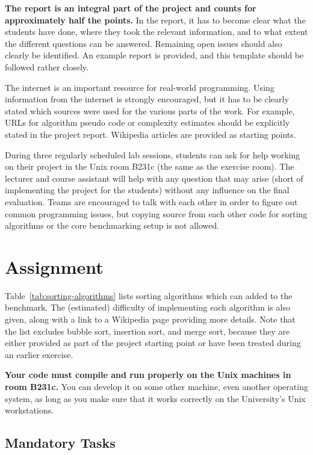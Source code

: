 \documentclass[a4paper,10pt]{article}
\begin{document}
\textbf{The report is an integral part of the project and counts for approximately half the points.}
In the report, it has to become clear what the students have done, where they took the relevant information, and to what extent the different questions can be answered.
Remaining open issues should also clearly be identified.
An example report is provided, and this template should be followed rather closely.

The internet is an important resource for real-world programming.
Using information from the internet is strongly encouraged, but it has to be clearly stated which sources were used for the various parts of the work.
For example, URLs for algorithm pseudo code or complexity estimates should be explicitly stated in the project report.
Wikipedia articles are provided as starting points.

During three regularly scheduled lab sessions, students can ask for help working on their project in the Unix room B231c (the same as the exercise room).
The lecturer and course assistant will help with any question that may arise (short of implementing the project for the students) without any influence on the final evaluation.
Teams are encouraged to talk with each other in order to figure out common programming issues, but copying source from each other code for sorting algorithms or the core benchmarking setup is not allowed.

\section*{Assignment}

Table~\ref{tab:sorting-algorithms} lists sorting algorithms which can added to the benchmark.
The (estimated) difficulty of implementing each algorithm is also given, along with a link to a Wikipedia page providing more details.
Note that the list excludes bubble sort, insertion sort, and merge sort, because they are either provided as part of the project starting point or have been treated during an earlier exercise.

\textbf{Your code must compile and run properly on the Unix machines in room B231c.}
You can develop it on some other machine, even another operating system, as long as you make sure that it works correctly on the University's Unix workstations.



\subsection*{Mandatory Tasks}
\end{document}
